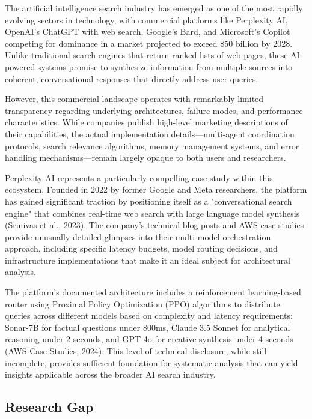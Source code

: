 \documentclass[12pt]{article}
\begin{document}
The artificial intelligence search industry has emerged as one of the most rapidly evolving sectors in technology, with commercial platforms like Perplexity AI, OpenAI's ChatGPT with web search, Google's Bard, and Microsoft's Copilot competing for dominance in a market projected to exceed \$50 billion by 2028. Unlike traditional search engines that return ranked lists of web pages, these AI-powered systems promise to synthesize information from multiple sources into coherent, conversational responses that directly address user queries.

However, this commercial landscape operates with remarkably limited transparency regarding underlying architectures, failure modes, and performance characteristics. While companies publish high-level marketing descriptions of their capabilities, the actual implementation details—multi-agent coordination protocols, search relevance algorithms, memory management systems, and error handling mechanisms—remain largely opaque to both users and researchers.

Perplexity AI represents a particularly compelling case study within this ecosystem. Founded in 2022 by former Google and Meta researchers, the platform has gained significant traction by positioning itself as a "conversational search engine" that combines real-time web search with large language model synthesis (Srinivas et al., 2023). The company's technical blog posts and AWS case studies provide unusually detailed glimpses into their multi-model orchestration approach, including specific latency budgets, model routing decisions, and infrastructure implementations that make it an ideal subject for architectural analysis.

The platform's documented architecture includes a reinforcement learning-based router using Proximal Policy Optimization (PPO) algorithms to distribute queries across different models based on complexity and latency requirements: Sonar-7B for factual questions under 800ms, Claude 3.5 Sonnet for analytical reasoning under 2 seconds, and GPT-4o for creative synthesis under 4 seconds (AWS Case Studies, 2024). This level of technical disclosure, while still incomplete, provides sufficient foundation for systematic analysis that can yield insights applicable across the broader AI search industry.

\subsection{Research Gap}
\end{document}
